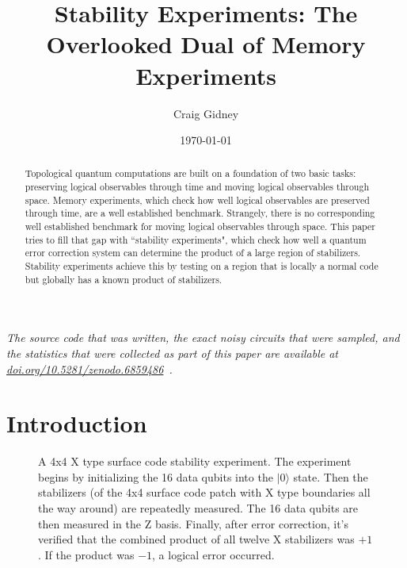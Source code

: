\documentclass[onecolumn,unpublished,a4paper]{quantumarticle}
\theoremstyle{definition}
\theoremstyle{definition}
\theoremstyle{definition}
\begin{document}
\title{Stability Experiments: The Overlooked Dual of Memory Experiments}

\date{\today}
\author{Craig Gidney}

\begin{abstract}
Topological quantum computations are built on a foundation of two basic tasks:
preserving logical observables through time
and moving logical observables through space.
Memory experiments, which check how well logical observables are preserved through time, are a well established benchmark.
Strangely, there is no corresponding well established benchmark for moving logical observables through space.
This paper tries to fill that gap with ``stability experiments", which check how well a quantum error correction system can determine the product of a large region of stabilizers.
Stability experiments achieve this by testing on a region that is locally a normal code but globally has a known product of stabilizers.
\end{abstract}

\maketitle

\emph{The source code that was written, the exact noisy circuits that were sampled, and the statistics that were collected as part of this paper are available at \href{https://doi.org/10.5281/zenodo.6859486}{doi.org/10.5281/zenodo.6859486}~\cite{craig_gidney_2022_6859486}.}

\section{Introduction}
\label{sec:introduction}

\begin{figure}[b!]
    \centering
    \caption{
        A 4x4 X type surface code stability experiment.
        The experiment begins by initializing the 16 data qubits into the $|0\rangle$ state.
        Then the stabilizers (of the 4x4 surface code patch with X type boundaries all the way around) are repeatedly measured.
        The 16 data qubits are then measured in the Z basis.
        Finally, after error correction, it's verified that the combined product of all twelve X stabilizers was $+1$.
        If the product was $-1$, a logical error occurred.
    }
    \label{fig:4x4_X}
\end{figure}
\end{document}

